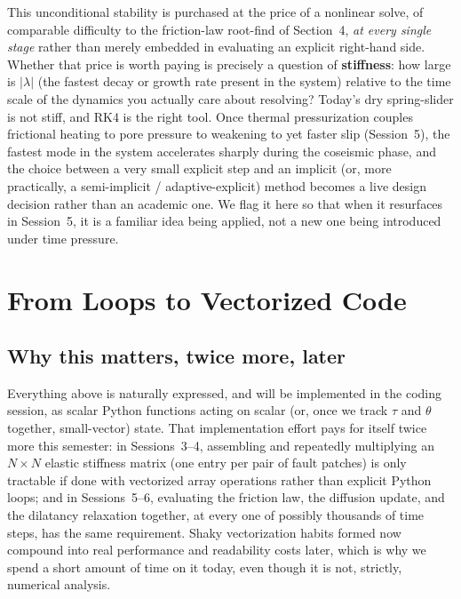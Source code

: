 This unconditional stability is purchased at the price of a nonlinear solve, of comparable difficulty to the friction-law root-find of Section~4, \emph{at every single stage} rather than merely embedded in evaluating an explicit right-hand side. Whether that price is worth paying is precisely a question of \textbf{stiffness}: how large is $|\lambda|$ (the fastest decay or growth rate present in the system) relative to the time scale of the dynamics you actually care about resolving? Today's dry spring-slider is not stiff, and RK4 is the right tool. Once thermal pressurization couples frictional heating to pore pressure to weakening to yet faster slip (Session~5), the fastest mode in the system accelerates sharply during the coseismic phase, and the choice between a very small explicit step and an implicit (or, more practically, a semi-implicit / adaptive-explicit) method becomes a live design decision rather than an academic one. We flag it here so that when it resurfaces in Session~5, it is a familiar idea being applied, not a new one being introduced under time pressure.

\section{From Loops to Vectorized Code}

\subsection{Why this matters, twice more, later}

Everything above is naturally expressed, and will be implemented in the coding session, as scalar Python functions acting on scalar (or, once we track $\tau$ and $\theta$ together, small-vector) state. That implementation effort pays for itself twice more this semester: in Sessions~3--4, assembling and repeatedly multiplying an $N\times N$ elastic stiffness matrix (one entry per pair of fault patches) is only tractable if done with vectorized array operations rather than explicit Python loops; and in Sessions~5--6, evaluating the friction law, the diffusion update, and the dilatancy relaxation together, at every one of possibly thousands of time steps, has the same requirement. Shaky vectorization habits formed now compound into real performance and readability costs later, which is why we spend a short amount of time on it today, even though it is not, strictly, numerical analysis.

